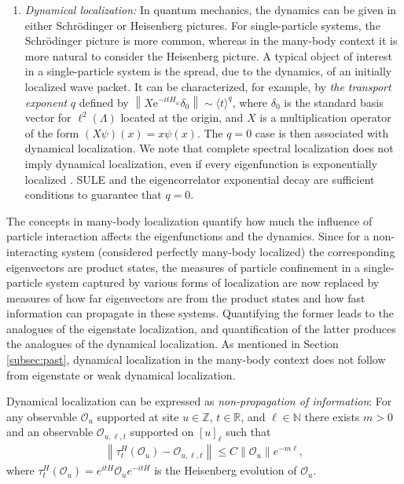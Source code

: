 \documentclass[12pt, a4paper,reqno]{amsart}
\numberwithin{equation}{section}
\newcommand\R{\mathbb R}
\newcommand\N{\mathbb N}
\newcommand\Z{\mathbb Z}
\newcommand\e{\mathrm{e}}
\newcommand\be{\begin{equation}\begin{aligned}}
\newcommand\ee{\end{aligned}\end{equation}}
\newcommand{\norm}[1]{\left\lVert #1 \right\rVert}
\newcommand\La{\Lambda}
\begin{document}
\begin{enumerate}
\item {\it Dynamical localization:} In quantum mechanics, the dynamics can be given in either Schr\"odinger or Heisenberg pictures. For  single-particle systems, the Schr\"o\-dinger picture is  more common, whereas in the many-body context it is more natural to consider the Heisenberg picture. A typical object of interest in a single-particle system is the spread, due to the dynamics, of an initially localized wave packet. It can be characterized, for example, by {\it the transport exponent} $q$ defined by $\norm{X\e^{-itH_\omega}\delta_0}\sim \langle t\rangle^q$, where $\delta_0$ is the standard basis vector for $\ell^2(\La)$ located at the origin, and $X$ is a multiplication operator of the form $(X\psi)(x)=x\psi(x)$. The $q=0$ case is then associated with dynamical localization. We note that  complete spectral localization does not imply  dynamical localization, even if every eigenfunction is exponentially localized  \cite{DJLS1}.  SULE  and the eigencorrelator exponential decay are sufficient conditions to guarantee that $q=0$. 

 \end{enumerate}
 
 
The concepts in many-body localization quantify how much the influence of particle interaction affects the eigenfunctions and the dynamics. Since for a non-interacting system (considered perfectly many-body localized) the corresponding eigenvectors are product states, the measures of particle confinement in a single-particle system captured by various forms of localization are now replaced by measures of how far eigenvectors are from the product states and how fast information can propagate in these systems. Quantifying the former leads to the analogues of the eigenstate localization, and quantification of the latter produces the analogues of the dynamical localization.   As  mentioned in Section \ref{subsec:past},  dynamical localization in the many-body context does not follow from eigenstate or weak dynamical localization.


Dynamical localization can be expressed as {\it non-propagation of information}: For any observable $\mathcal O_{u}$ supported at site $u \in \Z$, $t\in\R$, and  $\ell\in\N$ there exists $m>0$ and an observable  $\mathcal O_{u,\ell,t}$  supported on $[u]_\ell$ such that 
\be\label{eq:info}
\norm{\tau_t^H(\mathcal O_{u})-\mathcal O_{u,\ell,t}}\le C\norm{\mathcal O_{u}}e^{-m\ell},
\ee
where $\tau_t^H(\mathcal O_{u}) = e^{itH}\mathcal O_{u}e^{-itH}$ is the Heisenberg evolution of $\mathcal O_{u}$. 
\end{document}
